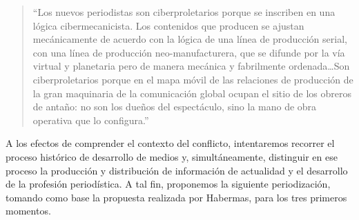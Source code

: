 \begin{quote}
	\enquote{Los nuevos periodistas son ciberproletarios porque se inscriben en una lógica cibermecanicista. Los contenidos que producen se ajustan mecánicamente de acuerdo con la lógica de una línea de producción serial, con una línea de producción neo-manufacturera, que se difunde por la vía virtual y planetaria pero de manera mecánica y fabrilmente ordenada\dots Son ciberproletarios porque en el mapa móvil de las relaciones de producción de la gran maquinaria de la comunicación global ocupan el sitio de los obreros de antaño: no son los dueños del espectáculo, sino la mano de obra operativa que lo configura.}
\end{quote}


A los efectos de comprender el contexto del conflicto, intentaremos recorrer el proceso histórico de desarrollo de medios y, simultáneamente, distinguir en ese proceso la producción y distribución de información de actualidad y el desarrollo de la profesión periodística. A tal fin, proponemos la siguiente periodización, tomando como base la propuesta realizada por Habermas, para los tres primeros momentos.

